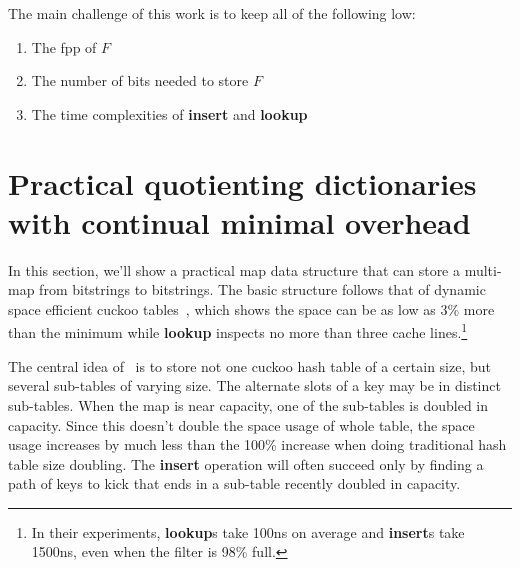 \documentclass[11pt,letterpaper]{article}
\begin{document}
The main challenge of this work is to keep all of the following low:

\begin{enumerate}
\item The fpp of $F$
\item The number of bits needed to store $F$
\item The time complexities of {\bf insert} and {\bf lookup}
\end{enumerate}

\section{Practical quotienting dictionaries with continual minimal overhead}


In this section, we'll show a practical map data structure that can store a multi-map from bitstrings to bitstrings.
The basic structure follows that of dynamic space efficient cuckoo tables~\cite{maier2019dynamic}, which shows the space can be as low as 3\% more than the minimum while {\bf lookup} inspects no more than three cache lines.\footnote{In their experiments, {\bf lookup}s take 100ns on average and {\bf insert}s take 1500ns, even when the filter is 98\% full.}

The central idea of~\cite{maier2019dynamic} is to store not one cuckoo hash table of a certain size, but several sub-tables of varying size.
The alternate slots of a key may be in distinct sub-tables.
When the map is near capacity, one of the sub-tables is doubled in capacity.
Since this doesn't double the space usage of whole table, the space usage increases by much less than the 100\% increase when doing traditional hash table size doubling.
The {\bf insert} operation will often succeed only by finding a path of keys to kick that ends in a sub-table recently doubled in capacity.


\end{document}
